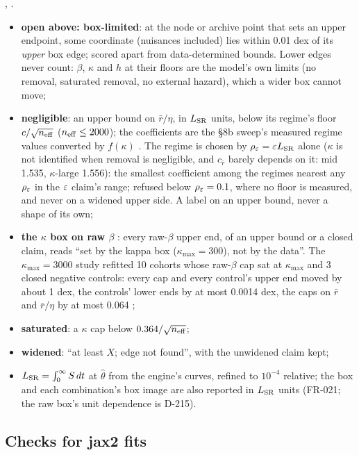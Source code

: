 , .
\begin{itemize}[nosep]
  \item \textbf{open above: box-limited}: at the node or archive point that sets an upper endpoint, some
    coordinate (nuisances included) lies within 0.01 dex of its \emph{upper} box edge; scored apart from
    data-determined bounds. Lower edges never count: $\beta$, $\kappa$ and $h$ at their floors are the model's own
    limits (no removal, saturated removal, no external hazard), which a wider box cannot move;
  \item \textbf{negligible}: an upper bound on $\bar r/\eta$, in $L_{\rm SR}$ units, below its regime's floor
    $c/\sqrt{n_{\rm eff}}$ ($n_{\rm eff}\le2000$); the coefficients are the \S8b sweep's measured regime values
    converted by $f(\kappa)$ . The regime is chosen by
    $\rho_\varepsilon=\varepsilon L_{\rm SR}$ alone ($\kappa$ is not identified when removal is negligible, and $c_{\bar r}$ barely
    depends on it: mid 1.535, $\kappa$-large 1.556): the smallest coefficient among the regimes nearest any $\rho_\varepsilon$
    in the $\varepsilon$ claim's range; refused below $\rho_\varepsilon=0.1$, where no floor is measured, and never on a widened
    upper side. A label on an upper bound, never a shape of its own;
  \item \textbf{the $\kappa$ box on raw $\beta$} : every raw-$\beta$ upper end, of an upper bound or
    a closed claim, reads ``set by the kappa box ($\kappa_{\max}=300$), not by the data''. The $\kappa_{\max}=3000$
    study refitted 10 cohorts whose raw-$\beta$ cap sat at $\kappa_{\max}$ and 3 closed negative controls: every cap
    and every control's upper end moved by about 1 dex, the controls' lower ends by at most 0.0014 dex, the caps on
    $\bar r$ and $\bar r/\eta$ by at most 0.064 ;
  \item \textbf{saturated}: a $\kappa$ cap below $0.364/\sqrt{n_{\rm eff}}$;
  \item \textbf{widened}: ``at least $X$; edge not found'', with the unwidened claim kept;
  \item $L_{\rm SR}=\int_0^\infty S\,dt$ at $\hat\theta$ from the engine's curves, refined to $10^{-4}$ relative; the
    box and each combination's box image are also reported in $L_{\rm SR}$ units (FR-021; the raw box's unit
    dependence is D-215).
\end{itemize}

\subsection{Checks for jax2 fits}\label{sec:pj-checks}

